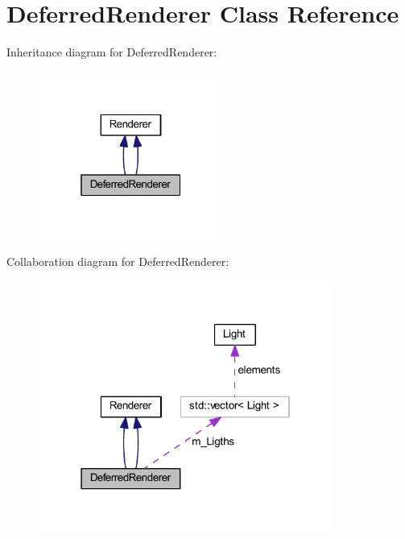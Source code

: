 \hypertarget{class_deferred_renderer}{}\section{Deferred\+Renderer Class Reference}
\label{class_deferred_renderer}


Inheritance diagram for Deferred\+Renderer\+:
\nopagebreak
\begin{figure}[H]
\begin{center}
\leavevmode
\includegraphics[width=172pt]{class_deferred_renderer__inherit__graph}
\end{center}
\end{figure}


Collaboration diagram for Deferred\+Renderer\+:
\nopagebreak
\begin{figure}[H]
\begin{center}
\leavevmode
\includegraphics[width=274pt]{class_deferred_renderer__coll__graph}
\end{center}
\end{figure}
